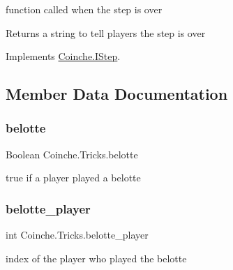 function called when the step is over 

\begin{DoxyReturn}{Returns}
a string to tell players the step is over
\end{DoxyReturn}


Implements \hyperlink{interface_coinche_1_1_i_step_a86ef55b4c36ffa27f5fa18a10e9a61a0}{Coinche.\+I\+Step}.



\subsection{Member Data Documentation}
\mbox{\label{class_coinche_1_1_tricks_a52b326e759bb3b8db0eb4aac4673c84e}} 
\subsubsection{\texorpdfstring{belotte}{belotte}}
{\footnotesize\ttfamily Boolean Coinche.\+Tricks.\+belotte\hspace{0.3cm}{\ttfamily [private]}}



true if a player played a belotte 

\mbox{\label{class_coinche_1_1_tricks_ad6c681dc74c4d3e916803c90bb8cb446}} 
\subsubsection{\texorpdfstring{belotte\+\_\+player}{belotte\_player}}
{\footnotesize\ttfamily int Coinche.\+Tricks.\+belotte\+\_\+player\hspace{0.3cm}{\ttfamily [private]}}



index of the player who played the belotte 

\mbox{\label{class_coinche_1_1_tricks_a989d0fe41242144d3b51145cce83195f}} 
